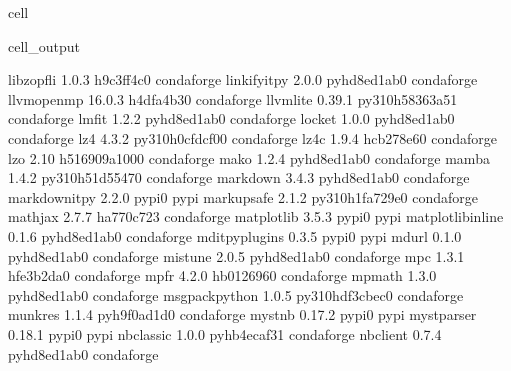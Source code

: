 \documentclass[letterpaper,table,10pt,english]{jupyterBook}
\begin{document}
\begin{sphinxuseclass}{cell}
\begin{sphinxVerbatimOutput}
\begin{sphinxuseclass}{cell_output}
\begin{sphinxVerbatim}[commandchars=\\\{\}]
libzopfli                 1.0.3                h9c3ff4c\PYGZus{}0    conda\PYGZhy{}forge
linkify\PYGZhy{}it\PYGZhy{}py             2.0.0              pyhd8ed1ab\PYGZus{}0    conda\PYGZhy{}forge
llvm\PYGZhy{}openmp               16.0.3               h4dfa4b3\PYGZus{}0    conda\PYGZhy{}forge
llvmlite                  0.39.1          py310h58363a5\PYGZus{}1    conda\PYGZhy{}forge
lmfit                     1.2.2              pyhd8ed1ab\PYGZus{}0    conda\PYGZhy{}forge
locket                    1.0.0              pyhd8ed1ab\PYGZus{}0    conda\PYGZhy{}forge
lz4                       4.3.2           py310h0cfdcf0\PYGZus{}0    conda\PYGZhy{}forge
lz4\PYGZhy{}c                     1.9.4                hcb278e6\PYGZus{}0    conda\PYGZhy{}forge
lzo                       2.10              h516909a\PYGZus{}1000    conda\PYGZhy{}forge
mako                      1.2.4              pyhd8ed1ab\PYGZus{}0    conda\PYGZhy{}forge
mamba                     1.4.2           py310h51d5547\PYGZus{}0    conda\PYGZhy{}forge
markdown                  3.4.3              pyhd8ed1ab\PYGZus{}0    conda\PYGZhy{}forge
markdown\PYGZhy{}it\PYGZhy{}py            2.2.0                    pypi\PYGZus{}0    pypi
markupsafe                2.1.2           py310h1fa729e\PYGZus{}0    conda\PYGZhy{}forge
mathjax                   2.7.7                ha770c72\PYGZus{}3    conda\PYGZhy{}forge
matplotlib                3.5.3                    pypi\PYGZus{}0    pypi
matplotlib\PYGZhy{}inline         0.1.6              pyhd8ed1ab\PYGZus{}0    conda\PYGZhy{}forge
mdit\PYGZhy{}py\PYGZhy{}plugins           0.3.5                    pypi\PYGZus{}0    pypi
mdurl                     0.1.0              pyhd8ed1ab\PYGZus{}0    conda\PYGZhy{}forge
mistune                   2.0.5              pyhd8ed1ab\PYGZus{}0    conda\PYGZhy{}forge
mpc                       1.3.1                hfe3b2da\PYGZus{}0    conda\PYGZhy{}forge
mpfr                      4.2.0                hb012696\PYGZus{}0    conda\PYGZhy{}forge
mpmath                    1.3.0              pyhd8ed1ab\PYGZus{}0    conda\PYGZhy{}forge
msgpack\PYGZhy{}python            1.0.5           py310hdf3cbec\PYGZus{}0    conda\PYGZhy{}forge
munkres                   1.1.4              pyh9f0ad1d\PYGZus{}0    conda\PYGZhy{}forge
myst\PYGZhy{}nb                   0.17.2                   pypi\PYGZus{}0    pypi
myst\PYGZhy{}parser               0.18.1                   pypi\PYGZus{}0    pypi
nbclassic                 1.0.0              pyhb4ecaf3\PYGZus{}1    conda\PYGZhy{}forge
nbclient                  0.7.4              pyhd8ed1ab\PYGZus{}0    conda\PYGZhy{}forge

\end{sphinxVerbatim}
\end{sphinxuseclass}
\end{sphinxVerbatimOutput}
\end{sphinxuseclass}
\end{document}

